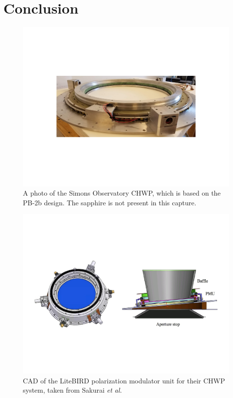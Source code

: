 \chapter{Conclusion}

\begin{figure}[!t]
    \centering
    \includegraphics[width=0.7\linewidth, trim=4.5cm 6.5cm 4.5cm 6.5cm, clip]{Conclusion/Figures/so_chwp.pdf}
    \caption[Photo of the Simons Observatory small aperture telescope CHWP.]{A photo of the Simons Observatory CHWP, which is based on the PB-2b design. The sapphire is not present in this capture.}
    \label{fig:so_chwp}
\end{figure}

\begin{figure}[!t]
    \centering
    \includegraphics[width=0.98\linewidth, trim=1cm 6cm 1cm 6cm, clip]{Conclusion/Figures/litebird_hwp.pdf}
    \caption[CAD of the LiteBIRD polarization modulator unit for their CHWP system.]{CAD of the LiteBIRD polarization modulator unit for their CHWP system, taken from Sakurai \textit{et al.}~\cite{Sakurai2018DesignLiteBIRD}}
    \label{fig:litebird_chwp}
\end{figure}

